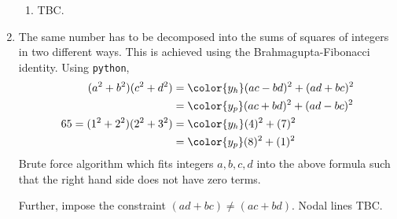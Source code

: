 \begin{enumerate}
\begin{enumerate}
              \item TBC.
          \end{enumerate}

    \item The same number has to be decomposed into the sums of squares of integers
          in two different ways. This is achieved using the Brahmagupta-Fibonacci
          identity. Using \texttt{python},
          \begin{align}
              (a^2 + b^2)(c^2 + d^2)      & = \color{y_h}(ac - bd)^2 + (ad + bc)^2 \\
                                          & = \color{y_p}(ac + bd)^2 + (ad - bc)^2 \\
              65 = (1^2 + 2^2)(2^2 + 3^2) & = \color{y_h}(4)^2 + (7)^2             \\
                                          & = \color{y_p}(8)^2 + (1)^2
          \end{align}
          Brute force algorithm which fits integers $ a,b,c,d $ into the above formula
          such that the right hand side does not have zero terms. \par
          Further, impose the constraint $ (ad + bc) \neq (ac + bd) $. Nodal lines TBC.


\end{enumerate}

